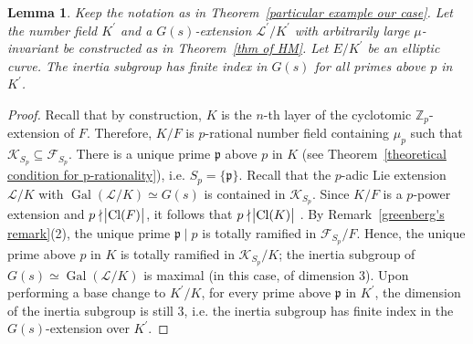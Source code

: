 \documentclass{amsart}
\DeclareMathOperator{\Gal}{Gal}
\DeclareMathOperator{\Cl}{Cl}
\newcommand{\F}{\mathcal F}
\newcommand{\K}{\mathcal K}
\newcommand{\ZZ}{\mathbb Z}
\newcommand{\fp}{\mathfrak p}
\newcommand{\Linf}{\mathcal{L}}
\newtheorem{Lemma}[Th]{Lemma}
\theoremstyle{definition}
\theoremstyle{remark}
\begin{document}
\begin{Lemma}
\label{lemma: checking inertia}
Keep the notation as in Theorem~\ref{particular example our case}.
Let the number field $K^\prime$ and a $G(s)$-extension $\Linf^\prime/K^\prime$ with arbitrarily large $\mu$-invariant be constructed as in Theorem~\ref{thm of HM}. 
Let $E/K^\prime$ be an elliptic curve.
The inertia subgroup has finite index in $G(s)$ for all primes above $p$ in $K^\prime$.
\end{Lemma}

\begin{proof}
Recall that by construction, $K$ is the $n$-th layer of the cyclotomic $\ZZ_p$-extension of $F$.
Therefore, $K/F$ is $p$-rational number field containing $\mu_p$ such that $\mathcal{K}_{S_p} \subseteq \mathcal{F}_{S_p}$.
There is a unique prime $\fp$ above $p$ in $K$ (see Theorem~\ref{theoretical condition for p-rationality}), i.e. $S_p =\{ \fp \}$.
Recall that the $p$-adic Lie extension $\Linf/K$ with $\Gal(\Linf/K)\simeq G(s)$ is contained in $\K_{S_p}$.
Since $K/F$ is a $p$-power extension and $p\nmid \abs{\Cl(F)}$, it follows that $p\nmid \abs{\Cl(K)}$ \cite[Theorem 10.4(1)]{Was97}.
By Remark~\ref{greenberg's remark}(2), the unique prime $\fp \mid p$ is totally ramified in $\F_{S_p}/F$. 
Hence, the unique prime above $p$ in $K$ is totally ramified in $\K_{S_p}/K$; the inertia subgroup of $G(s) \simeq \Gal(\Linf/K)$ is maximal (in this case, of dimension 3).
Upon performing a base change to $K^\prime/ K$, for every prime above $\fp$ in $K^\prime$, the dimension of the inertia subgroup is still 3, i.e. the inertia subgroup has finite index in the $G(s)$-extension over $K^\prime$.
\end{proof}
\end{document}
